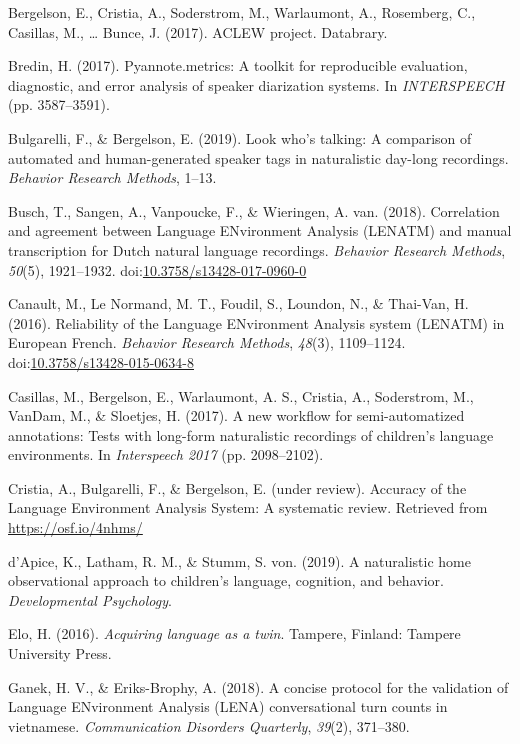\documentclass[english,floatsintext,man]{apa6}
\begin{document}
\hypertarget{ref-bergelson2017}{}
Bergelson, E., Cristia, A., Soderstrom, M., Warlaumont, A., Rosemberg,
C., Casillas, M., \ldots{} Bunce, J. (2017). ACLEW project. Databrary.

\hypertarget{ref-bredin2017pyannote}{}
Bredin, H. (2017). Pyannote.metrics: A toolkit for reproducible
evaluation, diagnostic, and error analysis of speaker diarization
systems. In \emph{INTERSPEECH} (pp. 3587--3591).

\hypertarget{ref-bulgarelli2019}{}
Bulgarelli, F., \& Bergelson, E. (2019). Look who's talking: A
comparison of automated and human-generated speaker tags in naturalistic
day-long recordings. \emph{Behavior Research Methods}, 1--13.

\hypertarget{ref-Busch2018}{}
Busch, T., Sangen, A., Vanpoucke, F., \& Wieringen, A. van. (2018).
Correlation and agreement between Language ENvironment Analysis (LENATM)
and manual transcription for Dutch natural language recordings.
\emph{Behavior Research Methods}, \emph{50}(5), 1921--1932.
doi:\href{https://doi.org/10.3758/s13428-017-0960-0}{10.3758/s13428-017-0960-0}

\hypertarget{ref-Canault2016}{}
Canault, M., Le Normand, M. T., Foudil, S., Loundon, N., \& Thai-Van, H.
(2016). Reliability of the Language ENvironment Analysis system (LENATM)
in European French. \emph{Behavior Research Methods}, \emph{48}(3),
1109--1124.
doi:\href{https://doi.org/10.3758/s13428-015-0634-8}{10.3758/s13428-015-0634-8}

\hypertarget{ref-casillas2017a}{}
Casillas, M., Bergelson, E., Warlaumont, A. S., Cristia, A., Soderstrom,
M., VanDam, M., \& Sloetjes, H. (2017). A new workflow for
semi-automatized annotations: Tests with long-form naturalistic
recordings of children's language environments. In \emph{Interspeech
2017} (pp. 2098--2102).

\hypertarget{ref-Cristia}{}
Cristia, A., Bulgarelli, F., \& Bergelson, E. (under review). Accuracy
of the Language Environment Analysis System: A systematic review.
Retrieved from \url{https://osf.io/4nhms/}

\hypertarget{ref-d2019naturalistic}{}
d'Apice, K., Latham, R. M., \& Stumm, S. von. (2019). A naturalistic
home observational approach to children's language, cognition, and
behavior. \emph{Developmental Psychology}.

\hypertarget{ref-Elo}{}
Elo, H. (2016). \emph{Acquiring language as a twin}. Tampere, Finland:
Tampere University Press.

\hypertarget{ref-ganek2018concise}{}
Ganek, H. V., \& Eriks-Brophy, A. (2018). A concise protocol for the
validation of Language ENvironment Analysis (LENA) conversational turn
counts in vietnamese. \emph{Communication Disorders Quarterly},
\emph{39}(2), 371--380.
\end{document}
